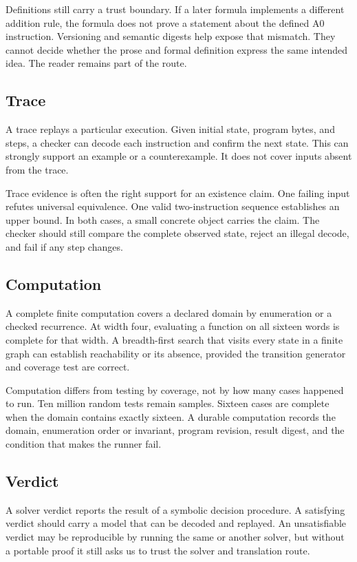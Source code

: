 Definitions still carry a trust boundary. If a later formula implements a
different addition rule, the formula does not prove a statement about the
defined A0 instruction. Versioning and semantic digests help expose that
mismatch. They cannot decide whether the prose and formal definition express
the same intended idea. The reader remains part of the route.

\subsection{Trace}

A trace replays a particular execution. Given initial state, program bytes,
and steps, a checker can decode each instruction and confirm the next state.
This can strongly support an example or a counterexample. It does not cover
inputs absent from the trace.

Trace evidence is often the right support for an existence claim. One failing
input refutes universal equivalence. One valid two-instruction sequence
establishes an upper bound. In both cases, a small concrete object carries the
claim. The checker should still compare the complete observed state, reject an
illegal decode, and fail if any step changes.

\subsection{Computation}

A complete finite computation covers a declared domain by enumeration or a
checked recurrence. At width four, evaluating a function on all sixteen words
is complete for that width. A breadth-first search that visits every state in
a finite graph can establish reachability or its absence, provided the
transition generator and coverage test are correct.

Computation differs from testing by coverage, not by how many cases happened
to run. Ten million random tests remain samples. Sixteen cases are complete
when the domain contains exactly sixteen. A durable computation records the
domain, enumeration order or invariant, program revision, result digest, and
the condition that makes the runner fail.

\subsection{Verdict}

A solver verdict reports the result of a symbolic decision procedure. A
satisfying verdict should carry a model that can be decoded and replayed. An
unsatisfiable verdict may be reproducible by running the same or another
solver, but without a portable proof it still asks us to trust the solver and
translation route.

